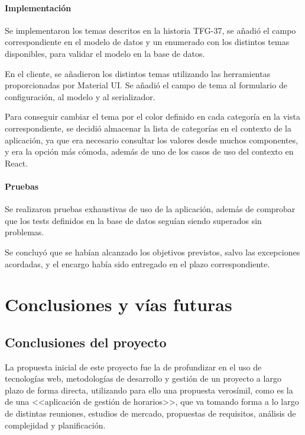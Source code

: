 \documentclass[10pt, a4paper]{aqademic}
\begin{document}
\subsubsection{Implementación}

Se implementaron los temas descritos en la historia TFG-37, se añadió el campo correspondiente en el modelo de datos y un enumerado con los distintos temas disponibles, para validar el modelo en la base de datos.

En el cliente, se añadieron los distintos temas utilizando las herramientas proporcionadas por Material UI. Se añadió el campo de tema al formulario de configuración, al modelo y al serializador. 

Para conseguir cambiar el tema por el color definido en cada categoría en la vista correspondiente, se decidió almacenar la lista de categorías en el contexto de la aplicación, ya que era necesario consultar los valores desde muchos componentes, y era la opción más cómoda, además de uno de los casos de uso del contexto en React.


\subsubsection{Pruebas}

Se realizaron pruebas exhaustivas de uso de la aplicación, además de comprobar que los tests definidos en la base de datos seguían siendo superados sin problemas.

Se concluyó que se habían alcanzado los objetivos previstos, salvo las excepciones acordadas, y el encargo había sido entregado en el plazo correspondiente.


\chapter{Conclusiones y vías futuras}

\section{Conclusiones del proyecto}

La propuesta inicial de este proyecto fue la de profundizar en el uso de tecnologías web, metodologías de desarrollo y gestión de un proyecto a largo plazo
de forma directa, utilizando para ello una propuesta verosímil, como es la de una <<aplicación de gestión de horarios>>, que va tomando forma a lo largo de distintas reuniones, estudios de mercado, propuestas de requisitos, análisis de complejidad y planificación. 
\end{document}
